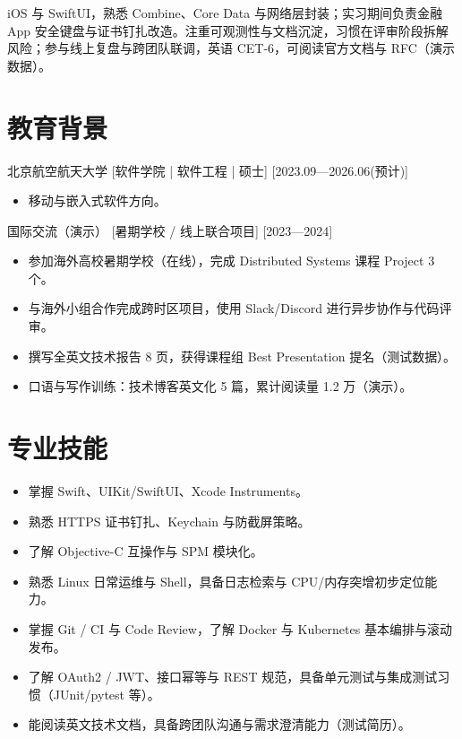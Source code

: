 \documentclass{resume-photo}
\begin{document}

\ResumeTitle

\noindent iOS 与 SwiftUI，熟悉 Combine、Core Data 与网络层封装；实习期间负责金融 App 安全键盘与证书钉扎改造。注重可观测性与文档沉淀，习惯在评审阶段拆解风险；参与线上复盘与跨团队联调，英语 CET-6，可阅读官方文档与 RFC（演示数据）。

\section{教育背景}
\ResumeItem
{北京航空航天大学}
[\textnormal{软件学院 | 软件工程 | 硕士}]
[2023.09—2026.06(预计)]

\begin{itemize}
  \item 移动与嵌入式软件方向。
\end{itemize}


\ResumeItem
{国际交流（演示）}
[\textnormal{暑期学校 / 线上联合项目}]
[2023—2024]

\begin{itemize}
  \item 参加海外高校暑期学校（在线），完成 Distributed Systems 课程 Project 3 个。
  \item 与海外小组合作完成跨时区项目，使用 Slack/Discord 进行异步协作与代码评审。
  \item 撰写全英文技术报告 8 页，获得课程组 Best Presentation 提名（测试数据）。
  \item 口语与写作训练：技术博客英文化 5 篇，累计阅读量 1.2 万（演示）。
\end{itemize}



\section{专业技能}
\begin{itemize}
  \item 掌握 Swift、UIKit/SwiftUI、Xcode Instruments。
  \item 熟悉 HTTPS 证书钉扎、Keychain 与防截屏策略。
  \item 了解 Objective-C 互操作与 SPM 模块化。
  \item 熟悉 Linux 日常运维与 Shell，具备日志检索与 CPU/内存突增初步定位能力。
  \item 掌握 Git / CI 与 Code Review，了解 Docker 与 Kubernetes 基本编排与滚动发布。
  \item 了解 OAuth2 / JWT、接口幂等与 REST 规范，具备单元测试与集成测试习惯（JUnit/pytest 等）。
  \item 能阅读英文技术文档，具备跨团队沟通与需求澄清能力（测试简历）。
\end{itemize}
\end{document}
